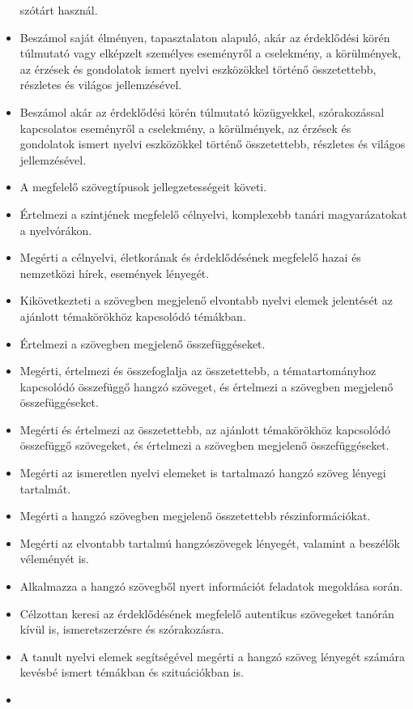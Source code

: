 \begin{itemize}
  szótárt használ.
\item
  Beszámol saját élményen, tapasztalaton alapuló, akár az érdeklődési
  körén túlmutató vagy elképzelt személyes eseményről a cselekmény, a
  körülmények, az érzések és gondolatok ismert nyelvi eszközökkel
  történő összetettebb, részletes és világos jellemzésével.
\item
  Beszámol akár az érdeklődési körén túlmutató közügyekkel,
  szórakozással kapcsolatos eseményről a cselekmény, a körülmények, az
  érzések és gondolatok ismert nyelvi eszközökkel történő összetettebb,
  részletes és világos jellemzésével.
\item
  A megfelelő szövegtípusok jellegzetességeit követi.
\item
  Értelmezi a szintjének megfelelő célnyelvi, komplexebb tanári
  magyarázatokat a nyelvórákon.
\item
  Megérti a célnyelvi, életkorának és érdeklődésének megfelelő hazai és
  nemzetközi hírek, események lényegét.
\item
  Kikövetkezteti a szövegben megjelenő elvontabb nyelvi elemek
  jelentését az ajánlott témakörökhöz kapcsolódó témákban.
\item
  Értelmezi a szövegben megjelenő összefüggéseket.
\item
  Megérti, értelmezi és összefoglalja az összetettebb, a
  tématartományhoz kapcsolódó összefüggő hangzó szöveget, és értelmezi a
  szövegben megjelenő összefüggéseket.
\item
  Megérti és értelmezi az összetettebb, az ajánlott témakörökhöz
  kapcsolódó összefüggő szövegeket, és értelmezi a szövegben megjelenő
  összefüggéseket.
\item
  Megérti az ismeretlen nyelvi elemeket is tartalmazó hangzó szöveg
  lényegi tartalmát.
\item
  Megérti a hangzó szövegben megjelenő összetettebb részinformációkat.
\item
  Megérti az elvontabb tartalmú hangzószövegek lényegét, valamint a
  beszélők véleményét is.
\item
  Alkalmazza a hangzó szövegből nyert információt feladatok megoldása
  során.
\item
  Célzottan keresi az érdeklődésének megfelelő autentikus szövegeket
  tanórán kívül is, ismeretszerzésre és szórakozásra.
\item
  A tanult nyelvi elemek segítségével megérti a hangzó szöveg lényegét
  számára kevésbé ismert témákban és szituációkban is.
\item

\end{itemize}
